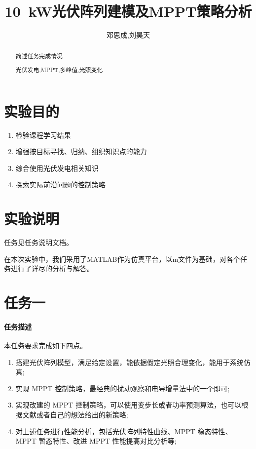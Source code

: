 \documentclass[a4paper,12pt]{article}
\title{\SI{10}{\kW}光伏阵列建模及MPPT策略分析}
\author{邓思成,刘昊天}
\begin{document}
    \begin{abstract}
        简述任务完成情况
        \begin{keywords}
            光伏发电,MPPT,多峰值,光照变化
        \end{keywords}
    \end{abstract}
    \maketitle
    \section{实验目的} %
    \label{sec:实验目的}
    \begin{enumerate}[noitemsep, topsep=0pt]
        \item 检验课程学习结果
        \item 增强按目标寻找、归纳、组织知识点的能力
        \item 综合使用光伏发电相关知识
        \item 探索实际前沿问题的控制策略
    \end{enumerate}
    \section{实验说明} %
    \label{sec:实验说明}
    任务见任务说明文档。

    在本次实验中，我们采用了MATLAB作为仿真平台，以m文件为基础，对各个任务进行了详尽的分析与解答。
    \section{任务一} %
    \label{sec:任务一}
    \paragraph{任务描述} %
    本任务要求完成如下四点。
    \begin{enumerate}[noitemsep,topsep=0pt]
    \item 搭建光伏阵列模型，满足给定设置，能依据假定光照合理变化，能用于系统仿真;
    \item 实现 MPPT 控制策略，最经典的扰动观察和电导增量法中的一个即可;
    \item 实现改建的 MPPT 控制策略，可以使用变步长或者功率预测算法，也可以根据文献或者自己的想法给出的新策略;
    \item 对上述任务进行性能分析，包括光伏阵列特性曲线、MPPT 稳态特性、MPPT 暂态特性、改进 MPPT 性能提高对比分析等;
    \end{enumerate}
\end{document}
